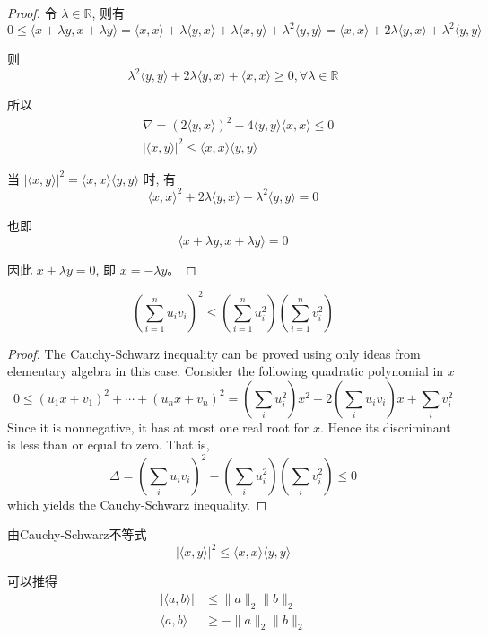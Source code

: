 \begin{proof}
    令 $\lambda \in \mathbb{R}$, 则有 
    $$0 \leq\langle x+\lambda y, x+\lambda y\rangle=\langle x, x\rangle+\lambda\langle y, x\rangle+\lambda\langle x, y\rangle+\lambda^{2}\langle y, y\rangle=\langle x, x\rangle+2 \lambda\langle y, x\rangle+\lambda^{2}\langle y, y\rangle$$

则 
$$\lambda^{2}\langle y, y\rangle+2 \lambda\langle y, x\rangle+\langle x, x\rangle \geq 0, \forall \lambda \in \mathbb{R}$$

所以
$$
\begin{aligned}
&\nabla=(2\langle y, x\rangle)^{2}-4\langle y, y\rangle\langle x, x\rangle \leq 0 \\
&|\langle x, y\rangle|^{2} \leq\langle x, x\rangle\langle y, y\rangle
\end{aligned}
$$

当 $|\langle x, y\rangle|^{2}=\langle x, x\rangle\langle y, y\rangle$ 时, 有 $$\langle x, x\rangle^{2}+2 \lambda\langle y, x\rangle+\lambda^{2}\langle y, y\rangle=0$$

也即 $$\langle x+\lambda y, x+\lambda y\rangle=0$$

因此 $x+\lambda y=0$, 即 $x=-\lambda y$。
\end{proof}

\begin{theorem}

    $$\left(\sum_{i=1}^{n} u_{i} v_{i}\right)^{2} \leq\left(\sum_{i=1}^{n} u_{i}^{2}\right)\left(\sum_{i=1}^{n} v_{i}^{2}\right)$$
\end{theorem}

\begin{proof}
    The Cauchy-Schwarz inequality can be proved using only ideas from elementary algebra in this case. Consider the following quadratic polynomial in $x$
$$
0 \leq\left(u_{1} x+v_{1}\right)^{2}+\cdots+\left(u_{n} x+v_{n}\right)^{2}=\left(\sum_{i} u_{i}^{2}\right) x^{2}+2\left(\sum_{i} u_{i} v_{i}\right) x+\sum_{i} v_{i}^{2}
$$
Since it is nonnegative, it has at most one real root for $x$. Hence its discriminant is less than or equal to zero. That is,
$$
\Delta = \left(\sum_{i} u_{i} v_{i}\right)^{2}-\left(\sum_{i} u_{i}^{2}\right)\left(\sum_{i} v_{i}^{2}\right) \leq 0
$$
which yields the Cauchy-Schwarz inequality.
\end{proof}

\begin{corollary}
    由Cauchy-Schwarz不等式
    $$
    |\langle x, y\rangle|^{2} \leq\langle x, x\rangle\langle y, y\rangle
    $$

    可以推得
    $$\begin{aligned}
        |\langle a,b \rangle| &\le \| a \|_2 \| b \|_2\\
        \langle a,b \rangle &\ge -\| a \|_2 \| b \|_2
    \end{aligned} $$
\end{corollary}


